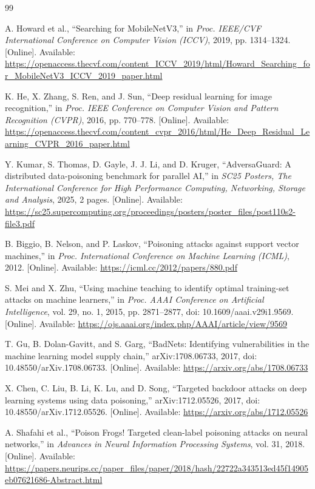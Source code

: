 ﻿\documentclass[6p,10pt,times]{ieeeaccess}
\begin{document}
\begin{thebibliography}{99}

A. Howard et al., ``Searching for MobileNetV3,'' in \emph{Proc. IEEE/CVF International Conference on Computer Vision (ICCV)}, 2019, pp. 1314--1324. [Online]. Available: \url{https://openaccess.thecvf.com/content_ICCV_2019/html/Howard_Searching_for_MobileNetV3_ICCV_2019_paper.html}

K. He, X. Zhang, S. Ren, and J. Sun, ``Deep residual learning for image recognition,'' in \emph{Proc. IEEE Conference on Computer Vision and Pattern Recognition (CVPR)}, 2016, pp. 770--778. [Online]. Available: \url{https://openaccess.thecvf.com/content_cvpr_2016/html/He_Deep_Residual_Learning_CVPR_2016_paper.html}

Y. Kumar, S. Thomas, D. Gayle, J. J. Li, and D. Kruger, ``AdversaGuard: A distributed data-poisoning benchmark for parallel AI,'' in \emph{SC25 Posters, The International Conference for High Performance Computing, Networking, Storage and Analysis}, 2025, 2 pages. [Online]. Available: \url{https://sc25.supercomputing.org/proceedings/posters/poster_files/post110s2-file3.pdf}

B. Biggio, B. Nelson, and P. Laskov, ``Poisoning attacks against support vector machines,'' in \emph{Proc. International Conference on Machine Learning (ICML)}, 2012. [Online]. Available: \url{https://icml.cc/2012/papers/880.pdf}

S. Mei and X. Zhu, ``Using machine teaching to identify optimal training-set attacks on machine learners,'' in \emph{Proc. AAAI Conference on Artificial Intelligence}, vol. 29, no. 1, 2015, pp. 2871--2877, doi: 10.1609/aaai.v29i1.9569. [Online]. Available: \url{https://ojs.aaai.org/index.php/AAAI/article/view/9569}

T. Gu, B. Dolan-Gavitt, and S. Garg, ``BadNets: Identifying vulnerabilities in the machine learning model supply chain,'' arXiv:1708.06733, 2017, doi: 10.48550/arXiv.1708.06733. [Online]. Available: \url{https://arxiv.org/abs/1708.06733}

X. Chen, C. Liu, B. Li, K. Lu, and D. Song, ``Targeted backdoor attacks on deep learning systems using data poisoning,'' arXiv:1712.05526, 2017, doi: 10.48550/arXiv.1712.05526. [Online]. Available: \url{https://arxiv.org/abs/1712.05526}

A. Shafahi et al., ``Poison Frogs! Targeted clean-label poisoning attacks on neural networks,'' in \emph{Advances in Neural Information Processing Systems}, vol. 31, 2018. [Online]. Available: \url{https://papers.neurips.cc/paper_files/paper/2018/hash/22722a343513ed45f14905eb07621686-Abstract.html}


\end{thebibliography}
\end{document}
